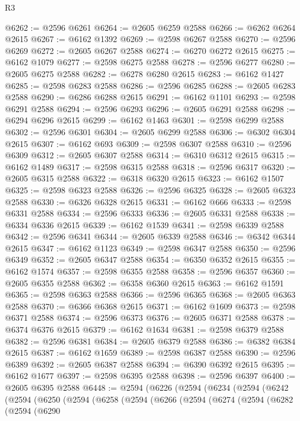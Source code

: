\begin{lexlean}{R3}
\begin{coremodule}
@6262 := @2596 @6261
@6264 := @2605 @6259 @2588
@6266 := @6262 @6264 @2615
@6267 := @6162 @1392
@6269 := @2598 @6267 @2588
@6270 := @2596 @6269
@6272 := @2605 @6267 @2588
@6274 := @6270 @6272 @2615
@6275 := @6162 @1079
@6277 := @2598 @6275 @2588
@6278 := @2596 @6277
@6280 := @2605 @6275 @2588
@6282 := @6278 @6280 @2615
@6283 := @6162 @1427
@6285 := @2598 @6283 @2588
@6286 := @2596 @6285
@6288 := @2605 @6283 @2588
@6290 := @6286 @6288 @2615
@6291 := @6162 @1101
@6293 := @2598 @6291 @2588
@6294 := @2596 @6293
@6296 := @2605 @6291 @2588
@6298 := @6294 @6296 @2615
@6299 := @6162 @1463
@6301 := @2598 @6299 @2588
@6302 := @2596 @6301
@6304 := @2605 @6299 @2588
@6306 := @6302 @6304 @2615
@6307 := @6162 @693
@6309 := @2598 @6307 @2588
@6310 := @2596 @6309
@6312 := @2605 @6307 @2588
@6314 := @6310 @6312 @2615
@6315 := @6162 @1489
@6317 := @2598 @6315 @2588
@6318 := @2596 @6317
@6320 := @2605 @6315 @2588
@6322 := @6318 @6320 @2615
@6323 := @6162 @1507
@6325 := @2598 @6323 @2588
@6326 := @2596 @6325
@6328 := @2605 @6323 @2588
@6330 := @6326 @6328 @2615
@6331 := @6162 @666
@6333 := @2598 @6331 @2588
@6334 := @2596 @6333
@6336 := @2605 @6331 @2588
@6338 := @6334 @6336 @2615
@6339 := @6162 @1539
@6341 := @2598 @6339 @2588
@6342 := @2596 @6341
@6344 := @2605 @6339 @2588
@6346 := @6342 @6344 @2615
@6347 := @6162 @1123
@6349 := @2598 @6347 @2588
@6350 := @2596 @6349
@6352 := @2605 @6347 @2588
@6354 := @6350 @6352 @2615
@6355 := @6162 @1574
@6357 := @2598 @6355 @2588
@6358 := @2596 @6357
@6360 := @2605 @6355 @2588
@6362 := @6358 @6360 @2615
@6363 := @6162 @1591
@6365 := @2598 @6363 @2588
@6366 := @2596 @6365
@6368 := @2605 @6363 @2588
@6370 := @6366 @6368 @2615
@6371 := @6162 @1609
@6373 := @2598 @6371 @2588
@6374 := @2596 @6373
@6376 := @2605 @6371 @2588
@6378 := @6374 @6376 @2615
@6379 := @6162 @1634
@6381 := @2598 @6379 @2588
@6382 := @2596 @6381
@6384 := @2605 @6379 @2588
@6386 := @6382 @6384 @2615
@6387 := @6162 @1659
@6389 := @2598 @6387 @2588
@6390 := @2596 @6389
@6392 := @2605 @6387 @2588
@6394 := @6390 @6392 @2615
@6395 := @6162 @1677
@6397 := @2598 @6395 @2588
@6398 := @2596 @6397
@6400 := @2605 @6395 @2588
@6448 := @2594
    (@6226
      (@2594
        (@6234
          (@2594
            (@6242
              (@2594
                (@6250
                  (@2594
                    (@6258
                      (@2594
                        (@6266
                          (@2594
                            (@6274
                              (@2594
                                (@6282
                                  (@2594
                                    (@6290

\end{coremodule}
\end{lexlean}

